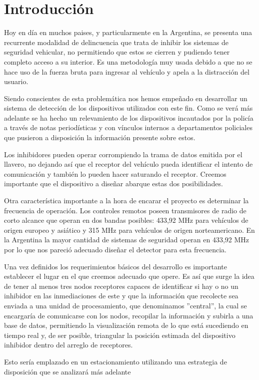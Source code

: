 \documentclass[12pt]{report}
\begin{document}
\chapter{Introducción}
Hoy en día en muchos paises, y particularmente en la Argentina, se presenta una recurrente modalidad de delincuencia que trata de 
inhibir los sistemas de seguridad vehicular, no permitiendo que estos se cierren y pudiendo tener completo acceso a su interior. Es 
una metodología muy usada debido a que no se hace uso de la fuerza bruta para ingresar al vehículo y apela a la distracción del usuario.\par
Siendo conscientes de esta problemática nos hemos empeñado en desarrollar un sistema de detección de los dispositivos utilizados
con este fin. Como se verá más adelante se ha hecho un relevamiento de los dispositivos incautados por la policía a través de notas
periodísticas y con vínculos internos a departamentos policiales que pusieron a disposición la información presente sobre estos.\par
Los inhibidores pueden operar corrompiendo la trama de datos emitida por el llavero, no dejando así que el receptor del vehículo 
pueda identificar el intento de comunicación y también lo pueden hacer saturando el receptor. Creemos importante que el dispositivo a diseñar 
abarque estas dos posibilidades. \par
Otra característica importante a la hora de encarar el proyecto es determinar la frecuencia de operación. Los controles remotos poseen transmisores
de radio de corto alcance que operan en dos bandas posibles: 433,92 MHz para vehículos de origen europeo y asiático y 315 MHz para vehículos de origen 
norteamericano. En la Argentina la mayor cantidad de sistemas de seguridad operan en 433,92 MHz por lo que nos pareció adecuado diseñar el
detector para esta frecuencia. \par
Una vez definidos los requerimientos básicos del desarrollo es importante establecer el lugar en el que creemos adecuado que opere. Es así
que surge la idea de tener al menos tres nodos receptores capaces de identificar si hay o no un inhibidor en las inmediaciones de este
y que la información que recolecte sea enviada a una unidad de procesamiento, que denominamos ''central'', la cual se encargaría de 
comunicarse con los nodos, recopilar la información y subirla a una base de datos, permitiendo la visualización remota de lo que está sucediendo 
en tiempo real y, de ser posible, triangular la posición estimada del dispositivo inhibidor dentro del arreglo de receptores.\par
Esto sería emplazado en un estacionamiento utilizando una estrategia de disposición que se analizará más adelante
\end{document}
